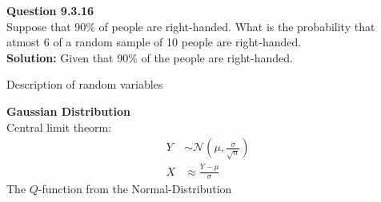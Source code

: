 \documentclass[journal,12pt,onecolumn]{IEEEtran}
\begin{document}
\newcommand{\solution}{\noindent \textbf{Solution: }}
\newcommand{\cosec}{\,\text{cosec}\,}
\providecommand{\dec}[2]{\ensuremath{\overset{#1}{\underset{#2}{\gtrless}}}}
\newcommand{\myvec}[1]{\ensuremath{\begin{pmatrix}#1\end{pmatrix}}}
\newcommand{\mydet}[1]{\ensuremath{\begin{vmatrix}#1\end{vmatrix}}}
\newcommand{\myaugvec}[2]{\ensuremath{\begin{amatrix}{#1}#2\end{amatrix}}}
\providecommand{\rank}{\text{rank}}
\providecommand{\pr}[1]{\ensuremath{\Pr\left(#1\right)}}
\providecommand{\qfunc}[1]{\ensuremath{Q\left(#1\right)}}
	\newcommand*{\permcomb}[4][0mu]{{{}^{#3}\mkern#1#2_{#4}}}
\newcommand*{\perm}[1][-3mu]{\permcomb[#1]{P}}
\newcommand*{\comb}[1][-1mu]{\permcomb[#1]{C}}
\providecommand{\qfunc}[1]{\ensuremath{Q\left(#1\right)}}
\providecommand{\gauss}[2]{\mathcal{N}\ensuremath{\left(#1,#2\right)}}
\providecommand{\diff}[2]{\ensuremath{\frac{d{#1}}{d{#2}}}}
\providecommand{\myceil}[1]{\left \lceil #1 \right \rceil }
\newcommand\figref{Fig.~\ref}
\newcommand\tabref{Table~\ref}
\newcommand{\sinc}{\,\text{sinc}\,}
\newcommand{\rect}{\,\text{rect}\,}
\let\vec\mathbf
\vspace{3cm}
\title{}
\author{EE22BTECH11029 - Komakula Sreeja}
\maketitle
\textbf{Question 9.3.16}\\ 
Suppose that 90\% of people are right-handed. What is the probability that atmost 6 of a random sample of 10 people are right-handed.\\
\solution
Given that 90\% of the people are right-handed.\\
\begin{table}[H]
        \caption{Description of random variables}
        \label{tab:ncert/9/3/16/}
        \centering
        
\end{table}
\textbf{Gaussian Distribution}\\
Central limit theorm:\\
\begin{align}
Y &\sim \gauss{\mu}{\frac{\sigma}{\sqrt{n}}}\\
X &\approx \frac{Y - \mu}{\sigma}
\end{align}
The $Q$-function from the Normal-Distribution\\
\end{document}
